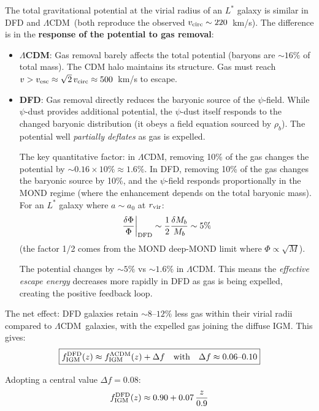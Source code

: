 \documentclass[11pt]{article}
\newcommand{\LCDM}{$\Lambda$CDM}
\newcommand{\fIGM}{f_{\rm IGM}}
\begin{document}
The total gravitational potential at the virial radius of an $L^*$
galaxy is similar in DFD and \LCDM\ (both reproduce the observed
$v_{\rm circ} \sim 220$~km/s).  The difference is in the
\textbf{response of the potential to gas removal}:

\begin{itemize}
\item \textbf{\LCDM}: Gas removal barely affects the total potential
  (baryons are $\sim 16\%$ of total mass).  The CDM halo maintains its
  structure.  Gas must reach $v > v_{\rm esc} \approx \sqrt{2}\,v_{\rm circ}
  \approx 500$~km/s to escape.

\item \textbf{DFD}: Gas removal directly reduces the baryonic source
  of the $\psi$-field.  While $\psi$-dust provides additional potential,
  the $\psi$-dust itself responds to the changed baryonic distribution
  (it obeys a field equation sourced by $\rho_b$).  The potential
  well \emph{partially deflates} as gas is expelled.

  The key quantitative factor: in \LCDM, removing 10\% of the gas
  changes the potential by $\sim 0.16 \times 10\% \approx 1.6\%$.
  In DFD, removing 10\% of the gas changes the baryonic source by
  10\%, and the $\psi$-field responds proportionally in the MOND
  regime (where the enhancement depends on the total baryonic mass).
  For an $L^*$ galaxy where $a \sim a_0$ at $r_{\rm vir}$:
  \begin{equation}
  \frac{\delta\Phi}{\Phi}\bigg|_{\rm DFD} \sim
  \frac{1}{2}\frac{\delta M_b}{M_b} \sim 5\%
  \end{equation}
  (the factor 1/2 comes from the MOND deep-MOND limit where $\Phi
  \propto \sqrt{M}$).

  The potential changes by $\sim 5\%$ vs $\sim 1.6\%$ in \LCDM.
  This means the \emph{effective escape energy} decreases more
  rapidly in DFD as gas is being expelled, creating the positive
  feedback loop.
\end{itemize}

The net effect: DFD galaxies retain $\sim 8$--$12\%$ less gas
within their virial radii compared to \LCDM\ galaxies, with
the expelled gas joining the diffuse IGM.  This gives:
\begin{equation}
\boxed{
\fIGM^{\rm DFD}(z) \approx \fIGM^{\rm \Lambda CDM}(z) + \Delta f
\quad\text{with}\quad
\Delta f \approx 0.06\text{--}0.10
}
\label{eq:fIGM-DFD}
\end{equation}

Adopting a central value $\Delta f = 0.08$:
\begin{equation}
\fIGM^{\rm DFD}(z) \approx 0.90 + 0.07\,\frac{z}{0.9}
\end{equation}
\end{document}
